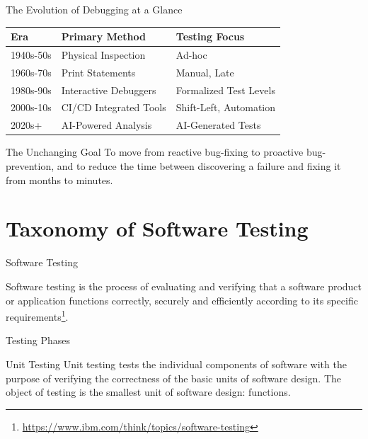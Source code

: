 \documentclass{beamer}
\begin{document}
\begin{frame}[t]{The Evolution of Debugging at a Glance}
\begin{center}
    \scriptsize
    \begin{tabular}{|l|l|l|}
    \hline
    \textbf{Era} & \textbf{Primary Method} & \textbf{Testing Focus} \\
    \hline
    1940s-50s   & Physical Inspection & Ad-hoc \\
    \hline
    1960s-70s   & Print Statements & Manual, Late \\
    \hline
    1980s-90s   & Interactive Debuggers  & Formalized Test Levels \\
    \hline
    2000s-10s   & CI/CD Integrated Tools & Shift-Left, Automation \\
    \hline
    2020s+      & AI-Powered Analysis & AI-Generated Tests \\
    \hline
    \end{tabular}
\end{center}
\vspace{1em}
\begin{block}{The Unchanging Goal}
To move from \alert{reactive} bug-fixing to \alert{proactive} bug-prevention, and to reduce the time between discovering a failure and fixing it from months to minutes.
\end{block}
\end{frame}

\section{Taxonomy of Software Testing}
\label{sec:concept}
\begin{frame}[t]{Software Testing}

    Software testing is the process of evaluating and verifying that a software product or application functions correctly, securely and efficiently according to its specific requirements\footnote{\url{https://www.ibm.com/think/topics/software-testing}}.
\end{frame}

\begin{frame}[t]{Testing Phases}
    \begin{block}
        {Unit Testing}
Unit testing tests the individual components of software with the purpose of verifying the correctness of the basic units of software design. The object of testing is the smallest unit of software design: functions.
    \end{block}
\end{frame}
\end{document}
